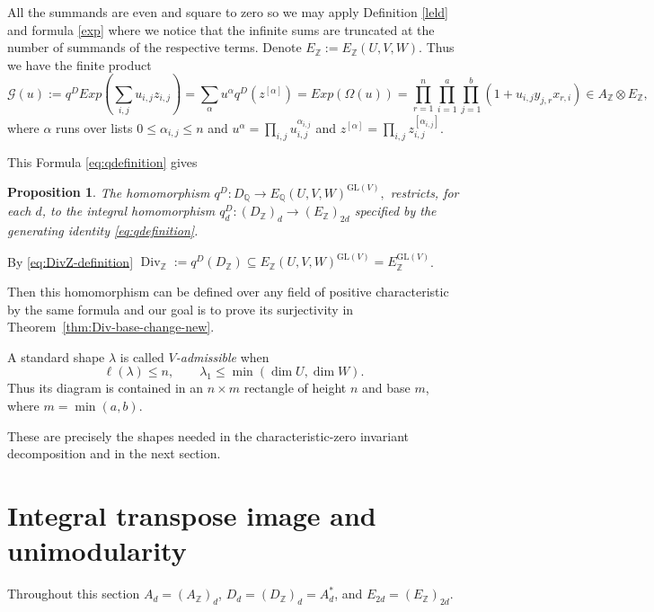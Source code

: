 \documentclass[10pt]{amsart}
\newtheorem{proposition}[theorem]{Proposition}
\theoremstyle{definition}
\theoremstyle{remark}
\newcommand{\Z}{\mathbb Z}
\newcommand{\Div}{\operatorname{Div}}
\begin{document}
All the summands are even and square to zero so we may apply Definition \ref{leld} and formula \eqref{exp}  where we notice that the infinite sums  are truncated at the number of summands of the respective terms. Denote $E_\Z:=E_{\mathbb Z}(U,V,W)$.
Thus  we have  the finite product
\begin{equation}\label{eq:qdefinition}
 \mathcal G (u):=q^{ D}Exp( \sum_{i, j}u_{i,j} z_{i,j})=
 \sum_{\alpha}u^\alpha q^D(z^{[\alpha]})
 =Exp( \Omega (u))= \prod_{r=1}^n\prod_{i=1}^a\prod_{j=1}^b(1+u_{i,j}y_{j,r}x_{r,i})\in A_\Z \otimes E_\Z ,
\end{equation}   where $\alpha$  runs over lists $0\leq \alpha_{i,j}\leq n$ and $u^\alpha=\prod_{i,j}u_{i,j}^{\alpha_{i,j}}$ and $z^{[\alpha]}=\prod_{i,j}z_{i,j}^{[\alpha_{i,j}]}$. \medskip
 

 This Formula  \eqref{eq:qdefinition} gives
\begin{proposition}\label{intf}
The homomorphism $ q^D :D_{\mathbb Q}\longrightarrow
 E_{\mathbb Q}(U,V,W)^{\mathrm{GL}(V)},$  restricts, for each $d$, to the integral homomorphism $q_d^D:(D_{\mathbb Z})_d\to(E_{\mathbb Z})_{2d}$ 
 specified by the generating identity
\eqref{eq:qdefinition}.
 \end{proposition}  
 
By  \eqref{eq:DivZ-definition}
 $ \Div_{\mathbb Z}:=q^D (D_{\mathbb Z})\subseteq  E_{\mathbb Z}(U,V,W)^{\mathrm{GL}(V)}=E_\Z^{\mathrm{GL}(V)}$.\medskip
 
 Then this homomorphism can be defined over any field of positive characteristic by the same formula and our goal is to prove its surjectivity in Theorem~\ref{thm:Div-base-change-new}.\medskip

A standard shape $\lambda$ is called
\emph{$V$-admissible} when
\begin{equation}\label{eq:admissible-rectangle}
 \ell(\lambda)\leq n,\qquad\lambda_1\leq\min(\dim U,\dim W).
\end{equation}
Thus its diagram is contained in an $n\times m$ rectangle of height $n$  and base $m$, where $m=\min(a,b)$.

These are precisely the shapes needed in the characteristic-zero
invariant decomposition and in the next section.

\section{Integral transpose image and unimodularity}
\label{sec:unimodularity-divided-power}
Throughout this section $A_d=(A_{\mathbb Z})_d$, $D_d=(D_{\mathbb Z})_d=A_d^*$, and $E_{2d}=(E_{\mathbb Z})_{2d}$. 
\end{document}
